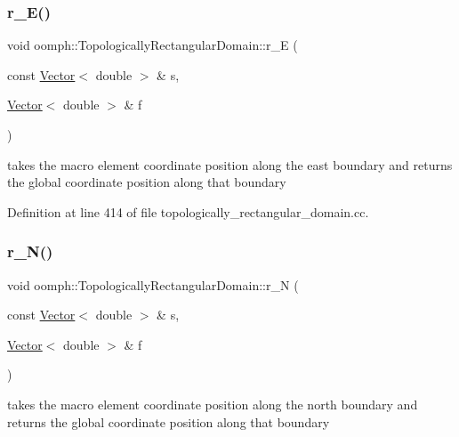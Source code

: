 \subsubsection{\texorpdfstring{r\+\_\+\+E()}{r\_E()}}
{\footnotesize\ttfamily void oomph\+::\+Topologically\+Rectangular\+Domain\+::r\+\_\+E (\begin{DoxyParamCaption}\item[{const \hyperlink{classoomph_1_1Vector}{Vector}$<$ double $>$ \&}]{s,  }\item[{\hyperlink{classoomph_1_1Vector}{Vector}$<$ double $>$ \&}]{f }\end{DoxyParamCaption})\hspace{0.3cm}{\ttfamily [private]}}



takes the macro element coordinate position along the east boundary and returns the global coordinate position along that boundary 



Definition at line 414 of file topologically\+\_\+rectangular\+\_\+domain.\+cc.

\mbox{\label{classoomph_1_1TopologicallyRectangularDomain_a6adb9d87f5dcedd2ede5a8da494930e5}} 
\subsubsection{\texorpdfstring{r\+\_\+\+N()}{r\_N()}}
{\footnotesize\ttfamily void oomph\+::\+Topologically\+Rectangular\+Domain\+::r\+\_\+N (\begin{DoxyParamCaption}\item[{const \hyperlink{classoomph_1_1Vector}{Vector}$<$ double $>$ \&}]{s,  }\item[{\hyperlink{classoomph_1_1Vector}{Vector}$<$ double $>$ \&}]{f }\end{DoxyParamCaption})\hspace{0.3cm}{\ttfamily [private]}}



takes the macro element coordinate position along the north boundary and returns the global coordinate position along that boundary 



